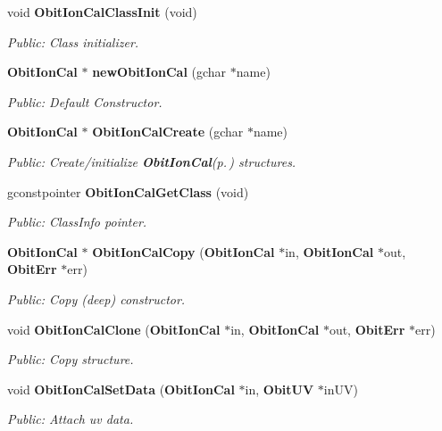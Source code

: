\begin{CompactItemize}
\item 
void {\bf Obit\-Ion\-Cal\-Class\-Init} (void)
\begin{CompactList}\small\item\em Public: Class initializer. \item\end{CompactList}\item 
{\bf Obit\-Ion\-Cal} $\ast$ {\bf new\-Obit\-Ion\-Cal} (gchar $\ast$name)
\begin{CompactList}\small\item\em Public: Default Constructor. \item\end{CompactList}\item 
{\bf Obit\-Ion\-Cal} $\ast$ {\bf Obit\-Ion\-Cal\-Create} (gchar $\ast$name)
\begin{CompactList}\small\item\em Public: Create/initialize {\bf Obit\-Ion\-Cal}{\rm (p.\,\pageref{structObitIonCal})} structures. \item\end{CompactList}\item 
gconstpointer {\bf Obit\-Ion\-Cal\-Get\-Class} (void)
\begin{CompactList}\small\item\em Public: Class\-Info pointer. \item\end{CompactList}\item 
{\bf Obit\-Ion\-Cal} $\ast$ {\bf Obit\-Ion\-Cal\-Copy} ({\bf Obit\-Ion\-Cal} $\ast$in, {\bf Obit\-Ion\-Cal} $\ast$out, {\bf Obit\-Err} $\ast$err)
\begin{CompactList}\small\item\em Public: Copy (deep) constructor. \item\end{CompactList}\item 
void {\bf Obit\-Ion\-Cal\-Clone} ({\bf Obit\-Ion\-Cal} $\ast$in, {\bf Obit\-Ion\-Cal} $\ast$out, {\bf Obit\-Err} $\ast$err)
\begin{CompactList}\small\item\em Public: Copy structure. \item\end{CompactList}\item 
void {\bf Obit\-Ion\-Cal\-Set\-Data} ({\bf Obit\-Ion\-Cal} $\ast$in, {\bf Obit\-UV} $\ast$in\-UV)
\begin{CompactList}\small\item\em Public: Attach uv data. \item\end{CompactList}\item 

\end{CompactItemize}
